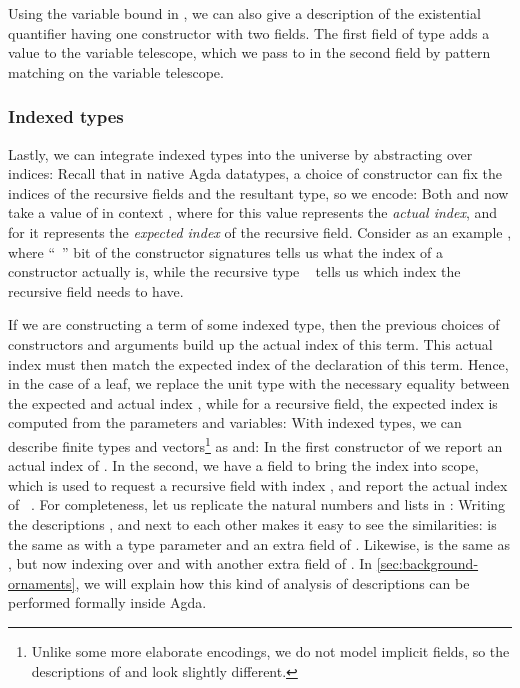 Using the variable bound in , we can also give a description of the existential quantifier
having one constructor with two fields. The first field of type  adds a value  to the variable telescope, which we pass to  in the second field by pattern matching on the variable telescope.


\subsubsection{Indexed types}\label{ssec:background-ix}
Lastly, we can integrate indexed types \cite{iir} into the universe by abstracting over indices:
Recall that in native Agda datatypes, a choice of constructor can fix the indices of the recursive fields and the resultant type, so we encode:
Both  and  now take a value of  in context , where for  this value represents the \emph{actual index}, and for  it represents the \emph{expected index} of the recursive field. Consider as an example , where ``\ '' bit of the constructor signatures tells us what the index of a constructor actually is, while the recursive type \  tells us which index the recursive field needs to have.

If we are constructing a term of some indexed type, then the previous choices of constructors and arguments build up the actual index of this term. This actual index must then match the expected index of the declaration of this term. Hence, in the case of a leaf, we replace the unit type with the necessary equality between the expected  and actual index  \cite{algorn}, while for a recursive field, the expected index  is computed from the parameters and variables:
With indexed types, we can describe finite types and vectors\footnote{Unlike some more elaborate encodings, we do not model implicit fields, so the descriptions of  and  look slightly different.} as
and:
In the first constructor of  we report an actual index of . In the second, we have a field \bN{} to bring the index  into scope, which is used to request a recursive field with index , and report the actual index of \ . For completeness, let us replicate the natural numbers and lists in :
Writing the descriptions ,  and  next to each other makes it easy to see the similarities:  is the same as  with a type parameter and an extra field  of . Likewise,  is the same as , but now indexing over \bN{} and with another extra field  of \bN{}. In \autoref{sec:background-ornaments}, we will explain how this kind of analysis of descriptions can be performed formally inside Agda.

